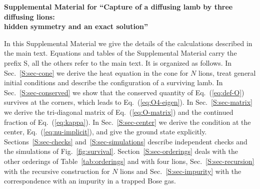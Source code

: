 \clearpage
\onecolumngrid
\setcounter{equation}{0}
\setcounter{figure}{0}
\setcounter{table}{0}
\setcounter{section}{0}
\setcounter{secnumdepth}{1}
\renewcommand{\thesection}{\Roman{section}}
\renewcommand{\theequation}{S\arabic{equation}}
\renewcommand{\thefigure}{S\arabic{figure}}
\renewcommand{\thetable}{S\arabic{table}}
\makeatletter
\renewcommand{\theHequation}{S\arabic{equation}}
\renewcommand{\theHfigure}{S\arabic{figure}}
\renewcommand{\theHtable}{S\arabic{table}}
\makeatother

\begin{center}
\textbf{\large Supplemental Material for ``Capture of a diffusing lamb by three diffusing lions:\\ hidden symmetry and an exact solution''}
\end{center}

In this Supplemental Material we give the details of the calculations described in the main text. Equations and tables of the Supplemental Material carry the prefix S, all the others refer to the main text. It is organized as follows. In Sec.~\ref{S:sec-cone} we derive the heat equation in the cone for $N$ lions, treat general initial conditions and describe the configuration of a surviving lamb. In Sec.~\ref{S:sec-conserved} we show that the conserved quantity of Eq.~(\ref{eq:def-O}) survives at the corners, which leads to Eq.~(\ref{eq:O4-eigen}). In Sec.~\ref{S:sec-matrix} we derive the tri-diagonal matrix of Eq.~(\ref{eq:O-matrix}) and the continued fraction of Eq.~(\ref{eq:kappa}). In Sec.~\ref{S:sec-center} we derive the condition at the center, Eq.~(\ref{eq:nu-implicit}), and give the ground state explicitly. Sections~\ref{S:sec-checks} and~\ref{S:sec-simulations} describe independent checks and the simulations of Fig.~\ref{fig:survival}. Section~\ref{S:sec-orderings} deals with the other orderings of Table~\ref{tab:orderings} and with four lions, Sec.~\ref{S:sec-recursion} with the recursive construction for $N$ lions and Sec.~\ref{S:sec-impurity} with the correspondence with an impurity in a trapped Bose gas.


